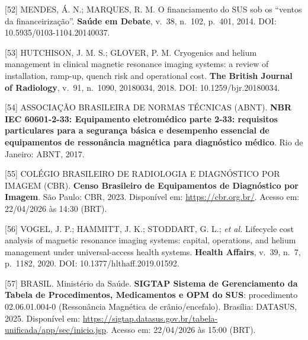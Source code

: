 \documentclass[12pt,a4paper,oneside]{article}
\begin{document}
\begin{singlespace}
\noindent\hangindent=1.25cm\label{ref:mendesmarques}
[52] MENDES, \'A. N.; MARQUES, R. M. O financiamento do SUS sob
os ``ventos da financeiriza\c{c}\~ao''. \textbf{Sa\'ude em Debate},
v.\ 38, n.\ 102, p.\ 401, 2014. DOI:
10.5935/0103-1104.20140037.
\par\smallskip

\noindent\hangindent=1.25cm\label{ref:hutchison-glover}
[53] HUTCHISON, J. M. S.; GLOVER, P. M. Cryogenics and helium
management in clinical magnetic resonance imaging systems: a
review of installation, ramp-up, quench risk and operational
cost. \textbf{The British Journal of Radiology}, v.\ 91, n.\ 1090,
20180034, 2018. DOI: 10.1259/bjr.20180034.
\par\smallskip

\noindent\hangindent=1.25cm\label{ref:abnt-rm}
[54] ASSOCIA\c{C}\~AO BRASILEIRA DE NORMAS T\'ECNICAS (ABNT).
\textbf{NBR IEC 60601-2-33: Equipamento eletrom\'edico \textemdash{}
parte 2-33: requisitos particulares para a seguran\c{c}a b\'asica
e desempenho essencial de equipamentos de resson\^ancia magn\'etica
para diagn\'ostico m\'edico}. Rio de Janeiro: ABNT, 2017.
\par\smallskip

\noindent\hangindent=1.25cm\label{ref:cbr-censo}
[55] COL\'EGIO BRASILEIRO DE RADIOLOGIA E DIAGN\'OSTICO POR
IMAGEM (CBR). \textbf{Censo Brasileiro de Equipamentos de
Diagn\'ostico por Imagem}. S\~ao Paulo: CBR, 2023. Dispon\'ivel em:
\url{https://cbr.org.br/}. Acesso em: 22/04/2026 \`as 14:30 (BRT).
\par\smallskip

\noindent\hangindent=1.25cm\label{ref:vogel-mri}
[56] VOGEL, J. P.; HAMMITT, J. K.; STODDART, G. L.;
\textit{et al.} Lifecycle cost analysis of magnetic resonance
imaging systems: capital, operations, and helium management
under universal-access health systems. \textbf{Health Affairs},
v.\ 39, n.\ 7, p.\ 1182, 2020. DOI:
10.1377/hlthaff.2019.01592.
\par\smallskip

\noindent\hangindent=1.25cm\label{ref:sigtap}
[57] BRASIL. Minist\'erio da Sa\'ude. \textbf{SIGTAP \textemdash{}
Sistema de Gerenciamento da Tabela de Procedimentos, Medicamentos
e OPM do SUS}: procedimento 02.06.01.004-0 (Resson\^ancia
Magn\'etica de cr\^anio/encefalo). Bras\'ilia: DATASUS, 2025.
Dispon\'ivel em:
\url{https://sigtap.datasus.gov.br/tabela-unificada/app/sec/inicio.jsp}.
Acesso em: 22/04/2026 \`as 15:00 (BRT).
\par\smallskip


\end{singlespace}
\end{document}
